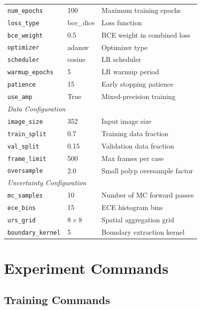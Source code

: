 \begin{table}[htbp]
\begin{tabular}{llp{6cm}}
		\texttt{num\_epochs}        & 100    & Maximum training epochs \\
		\texttt{loss\_type}         & bce\_dice & Loss function \\
		\texttt{bce\_weight}        & 0.5    & BCE weight in combined loss \\
		\texttt{optimizer}          & adamw  & Optimizer type \\
		\texttt{scheduler}          & cosine & LR scheduler \\
		\texttt{warmup\_epochs}     & 5      & LR warmup period \\
		\texttt{patience}           & 15     & Early stopping patience \\
		\texttt{use\_amp}           & True   & Mixed-precision training \\
		\midrule
		\multicolumn{3}{l}{\textit{Data Configuration}} \\
		\texttt{image\_size}        & 352    & Input image size \\
		\texttt{train\_split}       & 0.7    & Training data fraction \\
		\texttt{val\_split}         & 0.15   & Validation data fraction \\
		\texttt{frame\_limit}       & 500    & Max frames per case \\
		\texttt{oversample}         & 2.0    & Small polyp oversample factor \\
		\midrule
		\multicolumn{3}{l}{\textit{Uncertainty Configuration}} \\
		\texttt{mc\_samples}        & 10     & Number of MC forward passes \\
		\texttt{ece\_bins}          & 15     & ECE histogram bins \\
		\texttt{urs\_grid}          & $8\times 8$ & Spatial aggregation grid \\
		\texttt{boundary\_kernel}   & 5      & Boundary extraction kernel \\
		\bottomrule
	\end{tabular}
\end{table}


\section{Experiment Commands}
\label{sec:app:commands}

\subsection{Training Commands}

